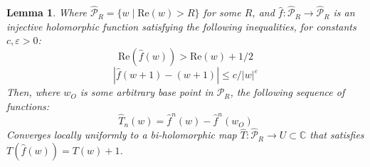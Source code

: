 \documentclass{article}
\newtheorem{lem}{Lemma}
\begin{document}
\begin{lem}
    \label{lem:That}
    Where $\hat{\mathcal{P}}_R=\{w\mid \mathrm{Re}(w) > R\}$ for some $R$, and $\hat{f}:\hat{\mathcal{P}}_R\to\hat{\mathcal{P}}_R$ is an injective holomorphic function satisfying the following inequalities, for constants $c, \varepsilon > 0$:
    \begin{equation*}
        \mathrm{Re}(\hat{f}(w)) > \mathrm{Re}(w) + 1/2
    \end{equation*}
    \begin{equation*}
        \left|\hat{f}(w+1)-(w+1)\right| \le c/|w|^\varepsilon
    \end{equation*}
    Then, where $w_O$ is some arbitrary base point in $\hat{\mathcal{P}}_R$, the following sequence of functions: 
    \begin{equation*}
        \hat{T}_n(w)=\hat{f}^n(w)-\hat{f}^n(w_O)
    \end{equation*}
    Converges locally uniformly to a bi-holomorphic map $\hat{T}:\hat{\mathcal{P}}_R\to U\subset \mathbb{C}$ that satisfies $T(\hat{f}(w))=T(w)+1$.
\end{lem}
\end{document}
